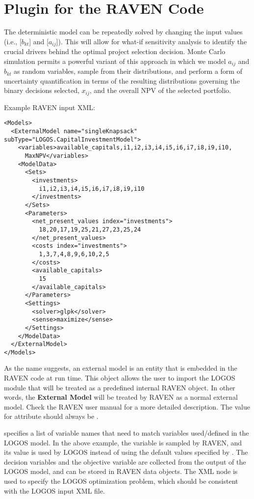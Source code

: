 \section{Plugin for the RAVEN Code}
\label{sec:RavenPlugin}

The deterministic model can be repeatedly solved by changing the input values (i.e.,
 [$b_{kt}$] and  [$a_{ij}$]).
This will allow for what-if sensitivity analysis to identify the
crucial drivers behind the optimal project selection decision. Monte Carlo simulation permits a
powerful variant of this approach in which we model $a_{ij}$ and $b_{kt}$ as random
variables, sample from their distributions, and perform a form of uncertainty quantification
in terms of the resulting distributions governing the binary decisions selected, $x_{ij}$, and
the overall NPV of the selected portfolio.

Example RAVEN input  XML:
\begin{lstlisting}[style=XML]
<Models>
  <ExternalModel name="singleKnapsack" subType="LOGOS.CapitalInvestmentModel">
    <variables>available_capitals,i1,i2,i3,i4,i5,i6,i7,i8,i9,i10,
      MaxNPV</variables>
    <ModelData>
      <Sets>
        <investments>
          i1,i2,i3,i4,i5,i6,i7,i8,i9,i10
        </investments>
      </Sets>
      <Parameters>
        <net_present_values index="investments">
          18,20,17,19,25,21,27,23,25,24
        </net_present_values>
        <costs index="investments">
          1,3,7,4,8,9,6,10,2,5
        </costs>
        <available_capitals>
          15
        </available_capitals>
      </Parameters>
      <Settings>
        <solver>glpk</solver>
        <sense>maximize</sense>
      </Settings>
    </ModelData>
  </ExternalModel>
</Models>
\end{lstlisting}

As the name suggests, an external model is an entity that is embedded in the RAVEN
code at run time. This object allows the user to import the LOGOS module that will
be treated as a predefined internal RAVEN object. In other words, the
\textbf{External Model} will be treated by RAVEN as a normal external model.
Check the RAVEN user manual for a more detailed description.
\nb The value for attribute  should always be .

 specifies a list of variable names that need to match
variables used/defined in the LOGOS model. In the above example, the variable
 is sampled by RAVEN, and its value is used
by LOGOS instead of using the default values specified by .
The decision variables  and the
objective variable  are collected from the output of the LOGOS model,
and can be stored in RAVEN data objects.
The XML node  is used to specify the LOGOS optimization problem, which
should be consistent with the LOGOS input XML file.

